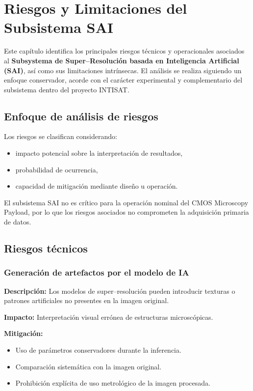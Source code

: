 \chapter{Riesgos y Limitaciones del Subsistema SAI}
\label{ch:riesgos}

Este capítulo identifica los principales riesgos técnicos y operacionales
asociados al \textbf{Subsystema de Super--Resolución basada en Inteligencia
Artificial (SAI)}, así como sus limitaciones intrínsecas. El análisis se realiza
siguiendo un enfoque conservador, acorde con el carácter experimental y
complementario del subsistema dentro del proyecto INTISAT.

\section{Enfoque de análisis de riesgos}

Los riesgos se clasifican considerando:
\begin{itemize}
    \item impacto potencial sobre la interpretación de resultados,
    \item probabilidad de ocurrencia,
    \item capacidad de mitigación mediante diseño u operación.
\end{itemize}

El subsistema SAI no es crítico para la operación nominal del CMOS Microscopy
Payload, por lo que los riesgos asociados no comprometen la adquisición primaria
de datos.

\section{Riesgos técnicos}

\subsection{Generación de artefactos por el modelo de IA}

\textbf{Descripción:}  
Los modelos de super--resolución pueden introducir texturas o patrones
artificiales no presentes en la imagen original.

\textbf{Impacto:}  
Interpretación visual errónea de estructuras microscópicas.

\textbf{Mitigación:}
\begin{itemize}
    \item Uso de parámetros conservadores durante la inferencia.
    \item Comparación sistemática con la imagen original.
    \item Prohibición explícita de uso metrológico de la imagen procesada.
\end{itemize}

